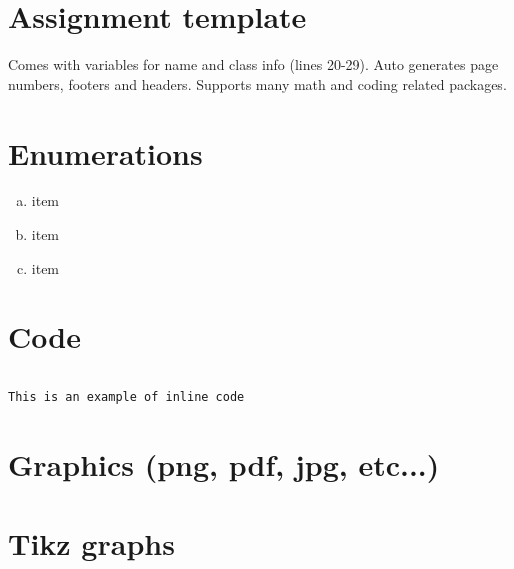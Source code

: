 \documentclass[fleqn, 12pt]{article}
\newcommand{\code}[2]{\colorbox{codegray}{\texttt{#2}}}
\newcommand{\codefile}{\inputminted}
\begin{document}
\beginassignment


\section*{Assignment template}

Comes with variables for name and class info (lines 20-29). Auto generates page numbers, footers and headers. Supports many math and coding related packages.

\section*{Enumerations}

\begin{enumerate}[a)]
    \item item
    \item item
    \item item
\end{enumerate}

\section*{Code}

\codefile{javascript}{code/sample.js}

\code{text}{This is an example of inline code}

\section*{Graphics (png, pdf, jpg, etc...)}


\newpage

\section*{Tikz graphs}
\end{document}

